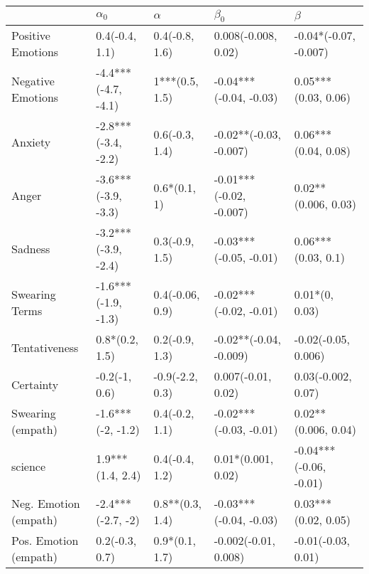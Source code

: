 \begin{tabular}{lllll}
\toprule
{} &           $\alpha_0$ &         $\alpha$ &                $\beta_0$ &                 $\beta$ \\
\midrule
Positive Emotions     &       0.4(-0.4, 1.1) &   0.4(-0.8, 1.6) &      0.008(-0.008, 0.02) &   -0.04*(-0.07, -0.007) \\
Negative Emotions     &  -4.4***(-4.7, -4.1) &   1***(0.5, 1.5) &   -0.04***(-0.04, -0.03) &     0.05***(0.03, 0.06) \\
Anxiety               &  -2.8***(-3.4, -2.2) &   0.6(-0.3, 1.4) &   -0.02**(-0.03, -0.007) &     0.06***(0.04, 0.08) \\
Anger                 &  -3.6***(-3.9, -3.3) &     0.6*(0.1, 1) &  -0.01***(-0.02, -0.007) &     0.02**(0.006, 0.03) \\
Sadness               &  -3.2***(-3.9, -2.4) &   0.3(-0.9, 1.5) &   -0.03***(-0.05, -0.01) &      0.06***(0.03, 0.1) \\
Swearing Terms        &  -1.6***(-1.9, -1.3) &  0.4(-0.06, 0.9) &   -0.02***(-0.02, -0.01) &          0.01*(0, 0.03) \\
Tentativeness         &       0.8*(0.2, 1.5) &   0.2(-0.9, 1.3) &   -0.02**(-0.04, -0.009) &     -0.02(-0.05, 0.006) \\
Certainty             &        -0.2(-1, 0.6) &  -0.9(-2.2, 0.3) &       0.007(-0.01, 0.02) &      0.03(-0.002, 0.07) \\
Swearing (empath)     &    -1.6***(-2, -1.2) &   0.4(-0.2, 1.1) &   -0.02***(-0.03, -0.01) &     0.02**(0.006, 0.04) \\
science               &     1.9***(1.4, 2.4) &   0.4(-0.4, 1.2) &       0.01*(0.001, 0.02) &  -0.04***(-0.06, -0.01) \\
Neg. Emotion (empath) &    -2.4***(-2.7, -2) &  0.8**(0.3, 1.4) &   -0.03***(-0.04, -0.03) &     0.03***(0.02, 0.05) \\
Pos. Emotion (empath) &       0.2(-0.3, 0.7) &   0.9*(0.1, 1.7) &     -0.002(-0.01, 0.008) &      -0.01(-0.03, 0.01) \\
\bottomrule
\end{tabular}
